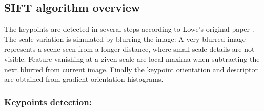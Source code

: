 \documentclass[preprint]{iucr}
\begin{document}
\subsection{SIFT algorithm overview}



The keypoints are detected in several steps according to Lowe's
original paper \cite{Lowe99}.
The scale variation is simulated by blurring the image:
A very blurred image represents a scene seen from a longer distance, where
small-scale details are not visible. Feature vanishing at a given scale are
local maxima when subtracting the next blurred from current image. Finally the
keypoint orientation and descriptor are obtained from gradient orientation
histograms.


\subsubsection{Keypoints detection:}
\end{document}
